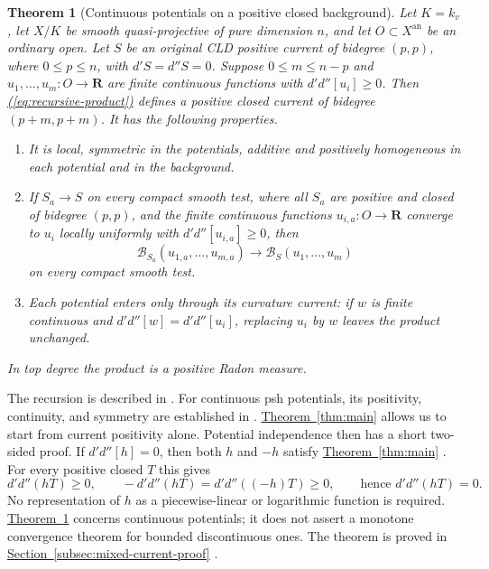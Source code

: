 \documentclass[11pt]{amsart}
\newtheorem{theorem}{Theorem}[section]
\theoremstyle{definition}
\theoremstyle{remark}
\numberwithin{equation}{section}
\newcommand{\ddc}{d'd''}
\newcommand{\an}{\mathrm{an}}
\newcommand{\R}{\mathbf R}
\newcommand{\namedref}[2]{%
 \begingroup
 \ifstrequal{#1}{Section}{\hypersetup{linkcolor=sectionteal}}{%
  \ifstrequal{#1}{Appendix}{\hypersetup{linkcolor=sectionteal}}{}}%
 \hyperref[#2]{#1~\ref*{#2}}%
 \endgroup}
\renewcommand{\eqref}[1]{%
 \begingroup\hypersetup{linkcolor=equationviolet}%
 \hyperref[#1]{\textup{(\ref*{#1})}}%
 \endgroup}
\begin{document}
\begin{theorem}[Continuous potentials on a positive closed background]
\label{thm:background-products}
Let \(K=k_v\), let \(X/K\) be smooth quasi-projective of pure dimension
\(n\), and let \(O\subset X^\an\) be an ordinary open. Let \(S\) be an
original CLD positive current of bidegree \((p,p)\), where \(0\leq p\leq n\), with
\(d'S=d''S=0\). Suppose \(0\leq m\leq n-p\) and
\(u_1,\ldots,u_m:O\to\R\) are finite continuous functions with
\(\ddc[u_i]\geq0\). Then \eqref{eq:recursive-product} defines a positive
closed current of bidegree \((p+m,p+m)\). It has the following properties.
\begin{enumerate}
\item It is local, symmetric in the potentials, additive and positively
homogeneous in each potential and in the background.
\item If \(S_a\to S\) on every compact smooth test, where all \(S_a\)
are positive and closed of bidegree \((p,p)\), and the finite
continuous functions \(u_{i,a}:O\to\R\) converge to \(u_i\) locally
uniformly with \(\ddc[u_{i,a}]\geq0\), then
\[
 \mathcal B_{S_a}(u_{1,a},\ldots,u_{m,a})
 \longrightarrow\mathcal B_S(u_1,\ldots,u_m)
\]
on every compact smooth test.
\item Each potential enters only through its curvature current:
if \(w\) is finite continuous and \(\ddc[w]=\ddc[u_i]\), replacing
\(u_i\) by \(w\) leaves the product unchanged.
\end{enumerate}
In top degree the product is a positive Radon measure.
\end{theorem}

The recursion is described in \cite[Section 5.6.8]{CLD12}.
For continuous psh potentials, its positivity, continuity, and symmetry
are established in
\cite[Lemma 8.5.5 and Propositions 8.7.2, 8.7.4]{CLD25}.
\namedref{Theorem}{thm:main} allows us to start from current positivity alone.
Potential independence then has a short two-sided proof. If \(\ddc[h]=0\), then both \(h\) and \(-h\) satisfy
\namedref{Theorem}{thm:main}. For every positive closed \(T\) this gives
\begin{equation}\label{eq:two-sided-intro}
 \ddc(hT)\geq0,\qquad -\ddc(hT)=\ddc((-h)T)\geq0,
 \qquad\text{hence }\ddc(hT)=0.
\end{equation}
No representation of \(h\) as a piecewise-linear or logarithmic function
is required. \namedref{Theorem}{thm:background-products} concerns continuous
potentials; it does not assert a monotone convergence theorem for
bounded discontinuous ones. The theorem is proved in
\namedref{Section}{subsec:mixed-current-proof}.
\end{document}
